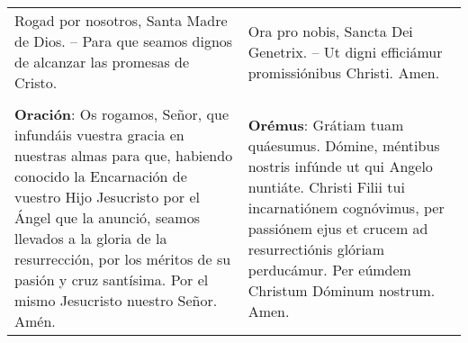 \begin{longtable} { p{} p{} }
    Rogad por nosotros, Santa Madre de Dios. -- Para que seamos dignos de alcanzar las promesas de Cristo.                   
    
     & 
    
    Ora pro nobis, Sancta Dei Genetrix. -- Ut digni efficiámur promissiónibus Christi. Amen. \\\\
    \textbf{Oración}: Os rogamos, Señor, que infundáis vuestra gracia en nuestras almas para que,
    habiendo conocido la Encarnación de vuestro Hijo Jesucristo por el Ángel que la anunció,
    seamos llevados a la gloria de la resurrección, por los méritos de su pasión y cruz santísima.
    Por el mismo Jesucristo nuestro Señor. Amén.                  
    
     &

    \textbf{Orémus}: Grátiam tuam quáesumus. Dómine, méntibus nostris infúnde ut qui Angelo nuntiáte.
    Christi Filii tui incarnatiónem cognóvimus, per passiónem ejus et crucem ad resurrectiónis glóriam perducámur.
    Per eúmdem Christum Dóminum nostrum. Amen.
\end{longtable}

